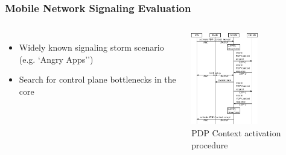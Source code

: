 \documentclass{beamer}
\begin{document}
\begin{frame}
	\frametitle{Mobile Network Signaling Evaluation}
	
	\begin{columns}

	\begin{itemize}
		\item Widely known signaling storm scenario\\ (e.g. `Angry Apps''\cite{schwartz2013angrybirds})
		\item Search for control plane bottlenecks in the core


	\end{itemize}

		\begin{center}
			\includegraphics[height=4cm]{../../chapters/04-mobilenets/images/pdp-context-activation-procedure.pdf}\\
			\vspace{-0.2cm}
 			{\small PDP Context activation procedure}
		\end{center}


\end{columns}
\end{frame}
\end{document}
